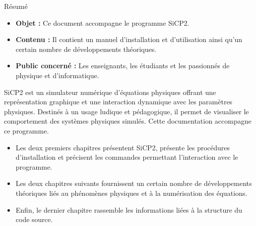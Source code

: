 \begin{center}
\Large
Résumé
\normalsize
\end{center}
\vspace{3cm}
\begin{itemize}[leftmargin=1cm, label=, itemsep=21pt]
\item {\bf Objet : }Ce document accompagne le programme SiCP2.
\item {\bf Contenu : }Il contient un manuel d'installation et d'utilisation ainsi qu'un certain nombre de développements théoriques.
\item {\bf Public concerné : }Les enseignants, les étudiants et les passionnés de physique et d'informatique.
\end{itemize}

\vspace{3cm}

SiCP2 est un simulateur numérique d'équations physiques offrant une représentation graphique et une interaction dynamique avec les paramètres physiques. Destinés à un usage ludique et pédagogique, il permet de visualiser le comportement des systèmes physiques simulés. Cette documentation accompagne ce programme.

\begin{itemize}[leftmargin=1cm, label=, itemsep=11pt]
\item Les deux premiers chapitres présentent SiCP2, présente les procédures d'installation et précisent les commandes permettant l'interaction avec le programme.
\item Les deux chapitres suivants fournissent un certain nombre de développements théoriques liés au phénomènes physiques et à la numérisation des équations.
\item Enfin, le dernier chapitre rassemble les informations liées à la structure du code source.
\end{itemize}
